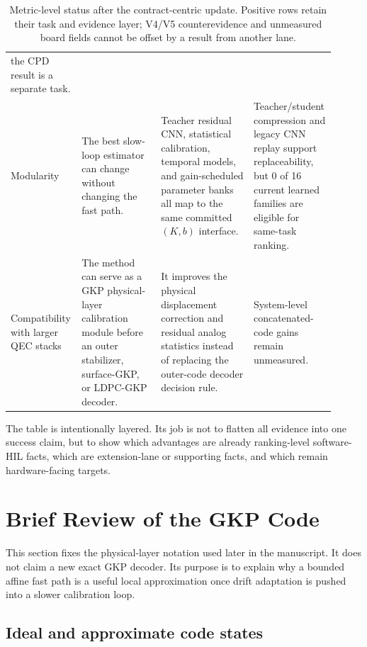 \documentclass[11pt]{article}
\begin{document}
\begin{table}[ht]
\begin{tabular}{@{}>{\raggedright\arraybackslash}p{0.18\linewidth}>{\raggedright\arraybackslash}p{0.24\linewidth}>{\raggedright\arraybackslash}p{0.29\linewidth}>{\raggedright\arraybackslash}p{0.20\linewidth}@{}}
the CPD result is a separate task. \\
\addlinespace
Modularity &
The best slow-loop estimator can change without changing the fast path. &
Teacher residual CNN, statistical calibration, temporal models, and
gain-scheduled parameter banks all map to the same committed \((K,b)\)
interface. &
Teacher/student compression and legacy CNN replay support replaceability, but
0 of 16 current learned families are eligible for same-task ranking. \\
\addlinespace
Compatibility with larger QEC stacks &
The method can serve as a GKP physical-layer calibration module before an
outer stabilizer, surface-GKP, or LDPC-GKP decoder. &
It improves the physical displacement correction and residual analog
statistics instead of replacing the outer-code decoder decision rule. &
System-level concatenated-code gains remain unmeasured. \\
\bottomrule
\end{tabular}
\caption{Metric-level status after the contract-centric update.  Positive rows
retain their task and evidence layer; V4/V5 counterevidence and unmeasured board
fields cannot be offset by a result from another lane.}
\label{tab:metric-advantages}
\end{table}

\noindent
The table is intentionally layered.  Its job is not to flatten all evidence
into one success claim, but to show which advantages are already ranking-level
software-HIL facts, which are extension-lane or supporting facts, and which
remain hardware-facing targets.

\section{Brief Review of the GKP Code}

This section fixes the physical-layer notation used later in the manuscript.
It does not claim a new exact GKP decoder.  Its purpose is to explain why a
bounded affine fast path is a useful local approximation once drift adaptation
is pushed into a slower calibration loop.

\subsection{Ideal and approximate code states}
\end{document}
